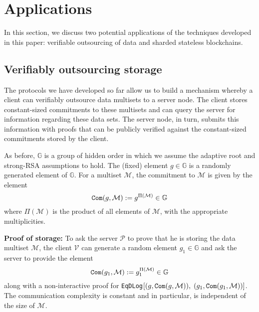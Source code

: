 \documentclass[11pt, lettersize, notitlepage, leqno, footskip=0.6cm]{article}
\newcommand{\mc}{\mathcal}
\newcommand{\mb}{\mathbb}
\newcommand{\mbf}{\mathbf}
\newcommand{\mP}{\mc{P}}
\newcommand{\V}{\mc{V}}
\newcommand{\vs}{\vspace{-0.15cm}}
\newcommand{\noin}{\noindent}
\newcommand{\np}{negligible probability}
\newcommand{\E}{\mc{E}}
\numberwithin{equation}{section}
\begin{document}



\section{\fontsize{12}{12}\selectfont Applications}

\noin In this section, we discuss two potential applications of the techniques developed in this paper: verifiable outsourcing of data and sharded stateless blockchains. \vs

\subsection{\fontsize{11}{11}\selectfont Verifiably outsourcing storage}

The protocols we have developed so far allow us to build a mechanism whereby a client can verifiably outsource data multisets to a server node. The client stores constant-sized commitments to these multisets and can query the server for information regarding these data sets. The server node, in turn, submits this information with proofs that can  be publicly verified against the constant-sized commitments stored by the client.

As before, $\mb{G}$ is a group of hidden order in which we assume the adaptive root and strong-RSA assumptions to hold. The (fixed) element $g\in\mb{G}$ is a randomly generated element of $\mb{G}$. For a multiset $\mc{M}$, the commitment to $\mc{M}$ is given by the element \vs $$\protect{\verb|Com|}(g, \mc{M}):= g^{\Pi(\mc{M})}\in\mb{G}$$ where $\Pi(\mc{M})$ is the product of all elements of $\mc{M}$, with the appropriate multiplicities. \vspace{0.15cm}

\noin \textbf{Proof of storage:} To ask the server $\mP$ to prove that he is storing the data multiset $\mc{M}$, the client $\V$ can generate a random element $g_1\in\mb{G}$ and ask the server to provide the element \vs $$\protect{\verb|Com|}(g_1, \mc{M}):= g_1^{\Pi(\mc{M})}\in\mb{G}$$ along with a non-interactive proof for \verb|EqDLog|$[(g, \protect{\verb|Com|}(g, \mc{M})),\;(g_1, \protect{\verb|Com|}(g_1, \mc{M}))]$. The communication complexity is constant and in particular, is independent of the size of $\mc{M}$.
\end{document}
